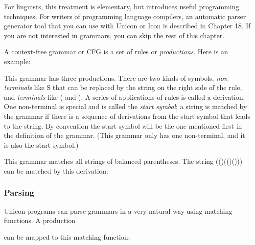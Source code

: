 For linguists, this treatment is elementary, but introduces useful
programming techniques. For writers of programming language compilers,
an automatic parser generator tool that you can use with Unicon or Icon
is described in Chapter 18. If you are not interested in grammars, you
can skip the rest of this chapter.

A context-free grammar or CFG is a set of
rules or \textit{productions}. Here is an example:


This grammar has three productions. There are two kinds of symbols,
\textit{non-terminals} like \textsf{S} that can be replaced by the
string on the right side of the rule, and \textit{terminals} like
\textsf{(} and \textsf{)}. A series of applications of rules is called
a derivation. One non-terminal is special and is called the
\textit{start symbol}; a string is matched by the grammar if there is a
sequence of derivations from the start symbol that leads to the string.
By convention the start symbol will be the one mentioned first in the
definition of the grammar. (This grammar only has one non-terminal, and
it is also the start symbol.)\textit{ }

This grammar matches all strings of balanced parentheses. The string
\textsf{(()(()()))} can be matched by this derivation:


\subsubsection{Parsing}

Unicon programs can parse grammars in a very natural way using matching
functions. A production


can be mapped to this matching function:


